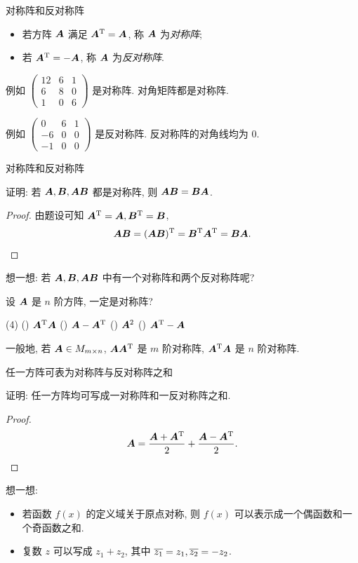 \begin{frame}{对称阵和反对称阵}
	\onslide<+->
	\begin{definition}[对称阵和反对称阵]
		\begin{itemize}
			\item 若方阵 ${\boldsymbol{A}}$ 满足 ${\boldsymbol{A}}^{\mathrm{T}}={\boldsymbol{A}}$, 称 ${\boldsymbol{A}}$ 为\emph{对称阵};
			\item 若 ${\boldsymbol{A}}^{\mathrm{T}}=-{\boldsymbol{A}}$, 称 ${\boldsymbol{A}}$ 为\emph{反对称阵}.
		\end{itemize}
	\end{definition}
	\onslide<+->
	例如 $\begin{pmatrix}
		12&6&1\\
		6&8&0\\
		1&0&6
	\end{pmatrix}$
	是对称阵.
	\onslide<+->
	对角矩阵都是对称阵.

	\onslide<+->
	例如 $\begin{pmatrix}
		0&6&1\\
		-6&0&0\\
		-1&0&0
	\end{pmatrix}$
	是反对称阵.
	\onslide<+->
	反对称阵的对角线均为 $0$.
\end{frame}


\begin{frame}{对称阵和反对称阵}
	\onslide<+->
	\begin{example}
		证明: 若 ${\boldsymbol{A}},{\boldsymbol{B}},{\boldsymbol{A}}{\boldsymbol{B}}$ 都是对称阵, 则 ${\boldsymbol{A}}{\boldsymbol{B}}={\boldsymbol{B}}{\boldsymbol{A}}$.
	\end{example}
	\onslide<+->
	\begin{proof}
		由题设可知 ${\boldsymbol{A}}^{\mathrm{T}}={\boldsymbol{A}},{\boldsymbol{B}}^{\mathrm{T}}={\boldsymbol{B}}$,
		\[{\boldsymbol{A}}{\boldsymbol{B}}=({\boldsymbol{A}}{\boldsymbol{B}})^{\mathrm{T}}={\boldsymbol{B}}^{\mathrm{T}}{\boldsymbol{A}}^{\mathrm{T}}={\boldsymbol{B}}{\boldsymbol{A}}.\qedhere\]
	\end{proof}
	\onslide<+->
	想一想: 若 ${\boldsymbol{A}},{\boldsymbol{B}},{\boldsymbol{A}}{\boldsymbol{B}}$ 中有一个对称阵和两个反对称阵呢?
	\onslide<+->
	\begin{exercise}
		设 ${\boldsymbol{A}}$ 是 $n$ 阶方阵, 一定是对称阵?
		\begin{taskschoice}(4)
			() ${\boldsymbol{A}}^{\mathrm{T}}{\boldsymbol{A}}$
			() ${\boldsymbol{A}}-{\boldsymbol{A}}^{\mathrm{T}}$
			() ${\boldsymbol{A}}^2$
			() ${\boldsymbol{A}}^{\mathrm{T}}-{\boldsymbol{A}}$
		\end{taskschoice}
	\end{exercise}
	\onslide<+->
	一般地, 若 ${\boldsymbol{A}}\in M_{m\times n}$, ${\boldsymbol{A}}{\boldsymbol{A}}^{\mathrm{T}}$ 是 $m$ 阶对称阵, ${\boldsymbol{A}}^{\mathrm{T}}{\boldsymbol{A}}$ 是 $n$ 阶对称阵.
\end{frame}


\begin{frame}{任一方阵可表为对称阵与反对称阵之和}
	\onslide<+->
	\begin{example}
		证明: 任一方阵均可写成一对称阵和一反对称阵之和.
	\end{example}
	\onslide<+->
	\begin{proof}
		\[{\boldsymbol{A}}=\frac{{\boldsymbol{A}}+{\boldsymbol{A}}^{\mathrm{T}}}2+\frac{{\boldsymbol{A}}-{\boldsymbol{A}}^{\mathrm{T}}}2.\qedhere\]
	\end{proof}
	\onslide<+->
	想一想:
	\begin{itemize}
		\item 若函数 $f(x)$ 的定义域关于原点对称, 则 $f(x)$ 可以表示成一个偶函数和一个奇函数之和.
		\item 复数 $z$ 可以写成 $z_1+z_2$, 其中 $\overline{z_1}=z_1,\overline{z_2}=-z_2$.
	\end{itemize}
\end{frame}

